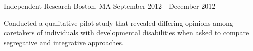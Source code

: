 \begin{cventries}
    {Independent Research}
    {Boston, MA}
    {September 2012 - December 2012}
    {\begin{cvitems}
        \item{Conducted a qualitative 
            {pilot study} that revealed differing opinions among caretakers of
            individuals with developmental disabilities when asked to compare
            segregative and integrative approaches.}
    \end{cvitems}}

\end{cventries}

